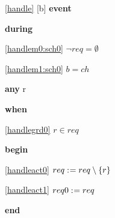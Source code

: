 \noindent \ref{handle} [b] \textbf{event}
\begin{block}
  \item   \textbf{during}
  \begin{block}
  \item[ \eqref{handlem0:sch0} ]{$\neg req = \emptyset$} %
  \item[ \eqref{handlem1:sch0} ]{$b = ch$} %
  \end{block}
  \item   \textbf{any} r
  \item   \textbf{when}
  \begin{block}
  \item[ \eqref{handlegrd0} ]{$r \in req$} %
  \end{block}
  \item   \textbf{begin}
  \begin{block}
  \item[ \eqref{handleact0} ]{$req \mathrel{:\mkern1mu=} req \setminus \{ r \}$} %
  \item[ \eqref{handleact1} ]{$req0 \mathrel{:\mkern1mu=} req$} %
  \end{block}
  \item   \textbf{end} \\
\end{block}
